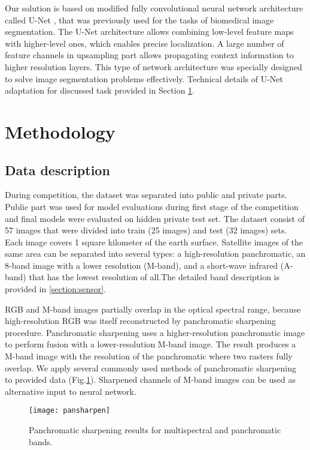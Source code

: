 \documentclass[10pt,twocolumn,letterpaper]{article}
\begin{document}
Our solution is based on modified fully convolutional neural network architecture called U-Net  \cite{unet}, that was previously used for the tasks of biomedical image segmentation. The U-Net architecture allows combining low-level feature maps with higher-level ones, which enables precise localization.  A large number of feature channels in upsampling part allows propagating context information to higher resolution layers.  This type of network architecture was specially designed to solve image segmentation problems effectively. Technical details of U-Net adaptation for discussed task provided in Section \ref{section:methods}.

\section{Methodology}
\label{section:methods}

\subsection{Data description}

During competition, the dataset was separated into public and private parts. Public part was used for model evaluations during first stage of the competition and final models were evaluated on hidden private test set.
The dataset consist of 57 images that were divided into train (25 images) and test (32 images) sets. Each image covers 1 square kilometer of the earth surface. Satellite images of the same area can be separated into several types: a high-resolution panchromatic, an 8-band image with a lower resolution (M-band), and a short-wave infrared (A-band) that has the lowest resolution of all.The detailed band description is provided in \ref{section:sensor}. 

RGB and M-band images partially overlap in the optical spectral range, because high-resolution RGB was itself reconstructed by panchromatic sharpening procedure. Panchromatic sharpening uses a higher-resolution panchromatic image to perform  fusion with a lower-resolution M-band image. The result produces a M-band image with the resolution of the panchromatic  where two rasters fully overlap. We apply several commonly used methods of panchromatic sharpening \cite{pansharp} to provided data (Fig.\ref{fig:pan}). Sharpened channels of M-band images can be used as alternative input to neural network.    

\begin{figure}[!h]
	\captionsetup{justification=centering}
	\centering
	\texttt{[image: pansharpen]}
	\caption{Panchromatic sharpening results for multispectral and panchromatic bands.}
	\label{fig:pan}
\end{figure}
\end{document}
